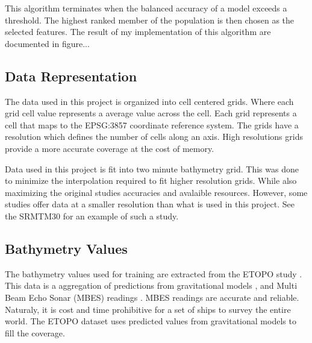 \par
This algorithm terminates when the balanced accuracy of a model exceeds a threshold.
The highest ranked member of the population is then chosen as the selected features.
The result of my implementation of this algorithm are documented in figure...

\subsection{Data Representation}
The data used in this project is organized into cell centered grids.
Where each grid cell value represents a average value across the cell.
Each grid represents a cell that maps to the EPSG:3857 coordinate reference system.
The grids have a resolution which defines the number of cells along an axis.
High resolutions grids provide a more accurate coverage at the cost of memory.

\par
Data used in this project is fit into two minute bathymetry grid. 
This was done to minimize the interpolation required to fit higher resolution grids.
While also maximizing the original studies accuracies and avalaible resources.
However, some studies offer data at a smaller resolution than what is used in this project.
See the SRMTM30 \cite{becker2009global} for an example of such a study.

\subsection{Bathymetry Values}
The bathymetry values used for training are extracted from the ETOPO study \cite{national1988etopo}.
This data is a aggregation of predictions from gravitational models \cite{smith1997global} \cite{smith1994bathymetric}, and Multi Beam Echo Sonar (MBES) readings \cite{farr1980multibeam}.
MBES readings are accurate and reliable. 
Naturaly, it is cost and time prohibitive for a set of ships to survey the entire world.
The ETOPO dataset uses predicted values from gravitational models to fill the coverage.
